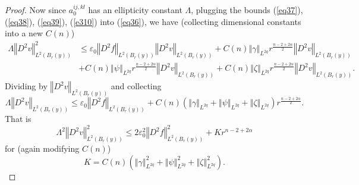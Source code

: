 \documentclass[12pt,leqno]{amsart}%
\theoremstyle{plain}
\numberwithin{equation}{section}
\theoremstyle{definition}
\begin{document}
\begin{proof}
Now since $a_{0}^{ij,kl}$ has an ellipticity constant $\Lambda$, plugging the
bounds (\ref{eq37}), (\ref{eq38}), (\ref{eq39}), (\ref{e310}) into
(\ref{eq36}), we have (collecting dimensional constants into a new $C(n)$)
\begin{align*}
\Lambda\left\Vert D^{2}v\right\Vert _{L^{2}(B_{r}(y))}^{2}  &  \leq
\varepsilon_{0}\left\Vert D^{2}f\right\Vert _{L^{2}(B_{r}(y))}\left\Vert
D^{2}v\right\Vert _{L^{2}(B_{r}(y))}+C(n)\left\Vert \gamma\right\Vert
_{L^{2q}}r^{\frac{n-2+2\alpha}{2}}\left\Vert D^{2}v\right\Vert _{L^{2}%
(B_{r}(y))}\\
&  +C(n)\left\Vert \psi\right\Vert _{L^{2q}}r^{\frac{n-2+2\alpha}{2}%
}\left\Vert D^{2}v\right\Vert _{L^{2}(B_{r}(y))}+C(n)\left\Vert \zeta
\right\Vert _{L^{2q}}r^{\frac{n-2+2\alpha}{2}}\left\Vert D^{2}v\right\Vert
_{L^{2}(B_{r}(y))}.
\end{align*}
Dividing by $\left\Vert D^{2}v\right\Vert _{L^{2}(B_{r}(y))}$ and collecting%
\[
\Lambda\left\Vert D^{2}v\right\Vert _{L^{2}(B_{r}(y))}\leq\varepsilon
_{0}\left\Vert D^{2}f\right\Vert _{L^{2}(B_{r}(y))}+C(n)\left(  \left\Vert
\gamma\right\Vert _{L^{2q}}+\left\Vert \psi\right\Vert _{L^{2q}}+\left\Vert
\zeta\right\Vert _{L^{2q}}\right)  r^{\frac{n-2+2\alpha}{2}}.
\]
That is%
\[
\Lambda^{2}\left\Vert D^{2}v\right\Vert _{L^{2}(B_{r}(y))}^{2}\leq
2\varepsilon_{0}^{2}\left\Vert D^{2}f\right\Vert _{L^{2}(B_{r}(y))}%
^{2}+Kr^{n-2+2\alpha}%
\]
for (again modifying $C(n)$)
\[
K=C(n)\left(  \left\Vert \gamma\right\Vert _{L^{2q}}^{2}+\left\Vert
\psi\right\Vert _{L^{2q}}^{2}+\left\Vert \zeta\right\Vert _{L^{2q}}%
^{2}\right)  .
\]





\end{proof}
\end{document}
